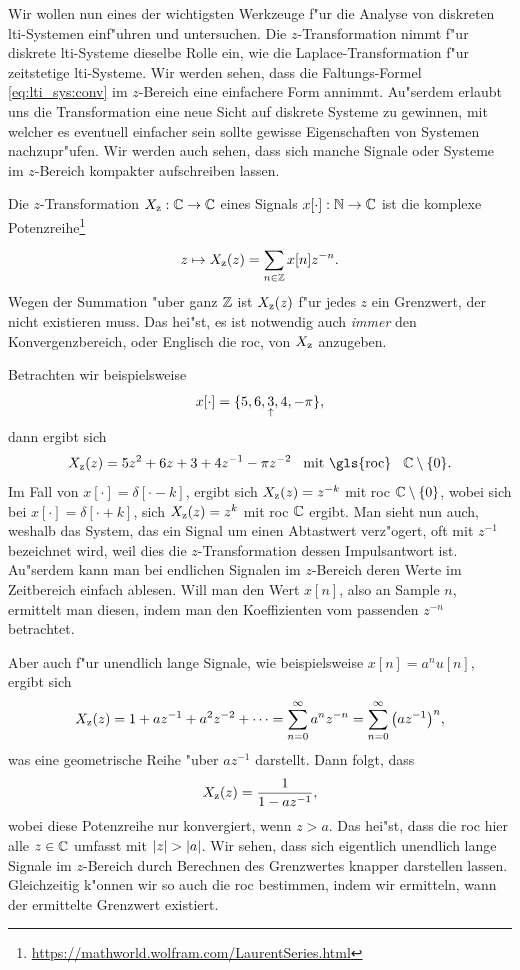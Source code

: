 Wir wollen nun eines der wichtigsten Werkzeuge f"ur die Analyse von diskreten \gls{lti}-Systemen einf"uhren und untersuchen.
Die $z$-Transformation nimmt f"ur diskrete \gls{lti}-Systeme dieselbe Rolle ein, wie die Laplace-Transformation f"ur zeitstetige \gls{lti}-Systeme.
Wir werden sehen, dass die Faltungs-Formel \eqref{eq:lti_sys:conv} im $z$-Bereich eine einfachere Form annimmt.
Au"serdem erlaubt uns die Transformation eine neue Sicht auf diskrete Systeme zu gewinnen, mit welcher es eventuell einfacher sein sollte gewisse Eigenschaften von Systemen nachzupr"ufen.
Wir werden auch sehen, dass sich manche Signale oder Systeme im $z$-Bereich kompakter aufschreiben lassen.

Die $z$-Transformation $X_{\rm z}: \mathbb{C} \rightarrow \mathbb{C}$ eines Signals $x[\cdot] : \mathbb{N} \rightarrow \mathbb{C}$ ist die komplexe Potenzreihe\footnote{\url{https://mathworld.wolfram.com/LaurentSeries.html}}
\begin{equation}\label{eq:ztrafo:def}
    z \mapsto X_{\rm z}(z) = {\sum\limits_{n\in\mathbb{Z}}^{}{x[n] z^{-n}}}.
\end{equation}
Wegen der Summation "uber ganz $\mathbb{Z}$ ist $X_{\rm z}(z)$ f"ur jedes $z$ ein Grenzwert, der nicht existieren muss.
Das hei"st, es ist notwendig auch \emph{immer} den Konvergenzbereich, oder Englisch die \gls{roc}, von $X_{\rm z}$ anzugeben.

Betrachten wir beispielsweise \[x[\cdot] = \{5,6,\underset{\uparrow}{3},4,-\pi\},\] dann ergibt sich \[X_\z(z) = 5 z^2 + 6 z + 3 + 4z^{-1} - \pi z^{-2} \Text{mit \gls{roc}} \C \setminus \{0\}.\] 
Im Fall von $x[\cdot] = \delta[\cdot-k]$, ergibt sich $X_{\rm z}(z) = z^{-k}$ mit \gls{roc} $\mathbb{C} \setminus \{0\}$, wobei sich bei $x[\cdot] = \delta[\cdot+k]$, sich $X_{\rm z}(z) = z^{k}$ mit \gls{roc} $\mathbb{C}$ ergibt.
Man sieht nun auch, weshalb das System, das ein Signal um einen Abtastwert verz"ogert, oft mit $z^{-1}$ bezeichnet wird, weil dies die $z$-Transformation dessen Impulsantwort ist.
Au"serdem kann man bei endlichen Signalen im $z$-Bereich deren Werte im Zeitbereich einfach ablesen. 
Will man den Wert $x[n]$, also an Sample $n$, ermittelt man diesen, indem man den Koeffizienten vom passenden $z^{-n}$ betrachtet. 

Aber auch f"ur unendlich lange Signale, wie beispielsweise $x[n] = a^n u[n]$, ergibt sich
\[
X_{\rm z}(z) 
    = 1 + a z^{-1} + a^2 z^{-2} + \dots
    = {\sum\limits_{n = 0}^{\infty}{
        a^n z^{-n}
    }}
    = {\sum\limits_{n = 0}^{\infty}{
        \left(a z^{-1}\right)^n
    }},
\]
was eine geometrische Reihe "uber $az^{-1}$ darstellt. 
Dann folgt, dass
\[
    X_{\rm z}(z) = \frac{1}{1 - a z^{-1}},
\]
wobei diese Potenzreihe nur konvergiert, wenn $z > a$.
Das hei"st, dass die \gls{roc} hier alle $z \in \mathbb{C}$ umfasst mit ${\left| z \right|} > {\left| a \right|}$.
Wir sehen, dass sich eigentlich unendlich lange Signale im $z$-Bereich durch Berechnen des Grenzwertes knapper darstellen lassen.
Gleichzeitig k"onnen wir so auch die \gls{roc} bestimmen, indem wir ermitteln, wann der ermittelte Grenzwert existiert.

